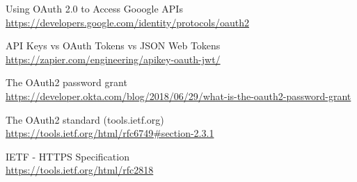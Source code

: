 \begin{thebibliography}{9}
    Using OAuth 2.0 to Access Gooogle APIs
    \\
    \url{https://developers.google.com/identity/protocols/oauth2}

    API Keys vs OAuth Tokens vs JSON Web Tokens
    \\
    \url{https://zapier.com/engineering/apikey-oauth-jwt/}

    The OAuth2 password grant
    \\
    \url{https://developer.okta.com/blog/2018/06/29/what-is-the-oauth2-password-grant}

    The OAuth2 standard (tools.ietf.org)
    \\
    \url{https://tools.ietf.org/html/rfc6749#section-2.3.1}

    IETF - HTTPS Specification
    \\
    \url{https://tools.ietf.org/html/rfc2818}
\end{thebibliography}
